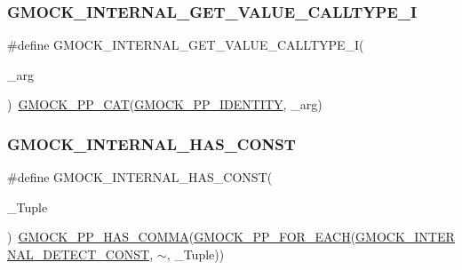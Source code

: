 \subsubsection{\texorpdfstring{GMOCK\_INTERNAL\_GET\_VALUE\_CALLTYPE\_I}{GMOCK\_INTERNAL\_GET\_VALUE\_CALLTYPE\_I}}
{\footnotesize\ttfamily \#define G\+M\+O\+C\+K\+\_\+\+I\+N\+T\+E\+R\+N\+A\+L\+\_\+\+G\+E\+T\+\_\+\+V\+A\+L\+U\+E\+\_\+\+C\+A\+L\+L\+T\+Y\+P\+E\+\_\+I(\begin{DoxyParamCaption}\item[{}]{\+\_\+arg }\end{DoxyParamCaption})~\mbox{\hyperlink{_obj__test_2lib_2googletest-master_2googlemock_2include_2gmock_2internal_2gmock-pp_8h_a108c52ffa81ab99348d23b8fa76fded3}{G\+M\+O\+C\+K\+\_\+\+P\+P\+\_\+\+C\+AT}}(\mbox{\hyperlink{_obj__test_2lib_2googletest-master_2googlemock_2include_2gmock_2internal_2gmock-pp_8h_a6123441ddc433915bfc8996a0a4eb397}{G\+M\+O\+C\+K\+\_\+\+P\+P\+\_\+\+I\+D\+E\+N\+T\+I\+TY}}, \+\_\+arg)}

\mbox{\label{googletest-master_2googlemock_2include_2gmock_2gmock-function-mocker_8h_a3fc6f99ce89d5117fcc366d44423a9f2}} 
\subsubsection{\texorpdfstring{GMOCK\_INTERNAL\_HAS\_CONST}{GMOCK\_INTERNAL\_HAS\_CONST}}
{\footnotesize\ttfamily \#define G\+M\+O\+C\+K\+\_\+\+I\+N\+T\+E\+R\+N\+A\+L\+\_\+\+H\+A\+S\+\_\+\+C\+O\+N\+ST(\begin{DoxyParamCaption}\item[{}]{\+\_\+\+Tuple }\end{DoxyParamCaption})~\mbox{\hyperlink{_obj__test_2lib_2googletest-master_2googlemock_2include_2gmock_2internal_2gmock-pp_8h_aaf83e01e56eb26d7eac9efb477587510}{G\+M\+O\+C\+K\+\_\+\+P\+P\+\_\+\+H\+A\+S\+\_\+\+C\+O\+M\+MA}}(\mbox{\hyperlink{_obj__test_2lib_2googletest-master_2googlemock_2include_2gmock_2internal_2gmock-pp_8h_abc9368d9b0960531e3cfb9e5d6a41816}{G\+M\+O\+C\+K\+\_\+\+P\+P\+\_\+\+F\+O\+R\+\_\+\+E\+A\+CH}}(\mbox{\hyperlink{_obj__test_2lib_2googletest-master_2googlemock_2include_2gmock_2gmock-function-mocker_8h_a3db348fab7c9ba65b3c9f4a7c1a9b3cc}{G\+M\+O\+C\+K\+\_\+\+I\+N\+T\+E\+R\+N\+A\+L\+\_\+\+D\+E\+T\+E\+C\+T\+\_\+\+C\+O\+N\+ST}}, $\sim$, \+\_\+\+Tuple))}

